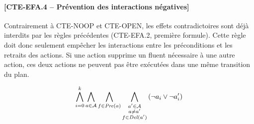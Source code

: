\paragraph*{[CTE-EFA.4 -- Prévention des interactions négatives]}

Contrairement à CTE-NOOP et CTE-OPEN, les effets contradictoires sont déjà interdits par les règles précédentes (CTE-EFA.2, première formule).
Cette règle doit donc seulement empêcher les interactions entre les préconditions et les retraits des actions. Si une action supprime un fluent nécessaire à une autre action, ces deux actions ne peuvent pas être exécutées dans une même transition du plan.

\[ \bigwedge\limits_{\substack{i=0}}^{k} \bigwedge\limits_{\substack{a \in \mathcal{A}}} \bigwedge\limits_{\substack{f\in \mathit{Pre}(a)}} \bigwedge\limits_{\substack{a' \in \mathcal{A} \\ a \neq a' \\ f \in \mathit{Del}(a')}}\left(\neg a_{i} \vee \neg a'_{i}\right) \]
